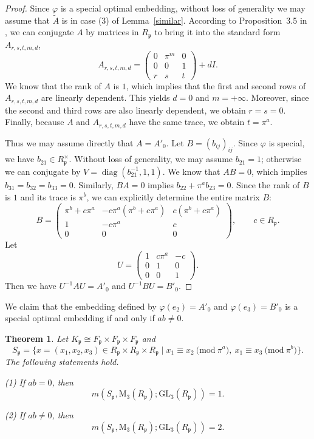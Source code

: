 \documentclass[12pt]{article}
\theoremstyle{plain}
\newtheorem{theorem}{Theorem}[section]
\theoremstyle{definition}
\theoremstyle{remark}
\begin{document}
\begin{proof}
Since $\varphi$ is a special optimal embedding, without loss of generality we may assume that $\widetilde{A}$ is in case (3) of Lemma~\ref{similar}. According to Proposition~3.5 in \cite{Avni29072009}, we can conjugate $A$ by matrices in $R_\mathfrak{p}$ to bring it into the standard form $A_{r,s,t,m,d}$,
$$A_{r,s,t,m,d}=\begin{pmatrix} 0 & \pi^m  & 0 \\ 0 & 0 & 1 \\ r & s & t \end{pmatrix}+dI.$$
We know that the rank of $A$ is $1$, which implies that the first and second rows of $A_{r,s,t,m,d}$ are linearly dependent. This yields $d = 0$ and $m = +\infty$. Moreover, since the second and third rows are also linearly dependent, we obtain $r=s=0$. Finally, because $A$ and $A_{r,s,t,m,d}$ have the same trace, we obtain $t = \pi^a$.

Thus we may assume directly that $A=A'_0$. Let $B=(b_{ij})_{ij}$. Since $\varphi$ is special, we have $b_{21}\in R_\mathfrak{p}^\times$. Without loss of generality, we may assume $b_{21} = 1$; otherwise we can conjugate by $V=\operatorname{diag}(b_{21}^{-1},1,1)$. We know that $AB = 0$, which implies $b_{31}=b_{32}=b_{33}=0$. Similarly, $BA = 0$ implies $b_{22}+\pi^a b_{23}=0$. Since the rank of $B$ is $1$ and its trace is $\pi^b$, we can explicitly determine the entire matrix $B$:
$$B=\begin{pmatrix}
\pi^b+c\pi^a & -c\pi^a(\pi^b+c\pi^a) & c(\pi^b+c\pi^a) \\
1 & -c\pi^a & c \\
0 & 0 & 0
\end{pmatrix},\qquad c\in R_\mathfrak{p}.$$
Let 
$$U=\begin{pmatrix}
1 & c\pi^a & -c \\
0 & 1 & 0 \\
0 & 0 & 1
\end{pmatrix}.$$
Then we have $U^{-1}AU = A'_0$ and $U^{-1}BU = B'_0$.
\end{proof}

We claim that the embedding defined by $\varphi(e_2)=A'_0$ and $\varphi(e_3)=B'_0$ is a special optimal embedding if and only if $ab\neq 0$.

\begin{theorem}
Let $K_\mathfrak{p}\cong F_\mathfrak{p}\times F_\mathfrak{p}\times F_\mathfrak{p}$ and
$$
S_\mathfrak{p}=\{x=(x_1,x_2,x_3)\in R_\mathfrak{p}\times R_\mathfrak{p}\times R_\mathfrak{p}\mid x_1\equiv x_2 \ \mathrm{(mod}\ \pi^a),\ x_1 \equiv x_3 \ \mathrm{(mod}\ \pi^b)\}.
$$
The following statements hold.

(1) If $ab=0$, then
$$m(S_\mathfrak{p},\mathrm{M}_3(R_\mathfrak{p});\mathrm{GL}_3(R_\mathfrak{p}))=1.$$

(2) If $ab\neq 0$, then
$$m(S_\mathfrak{p},\mathrm{M}_3(R_\mathfrak{p});\mathrm{GL}_3(R_\mathfrak{p}))=2.$$
\end{theorem}
\end{document}
